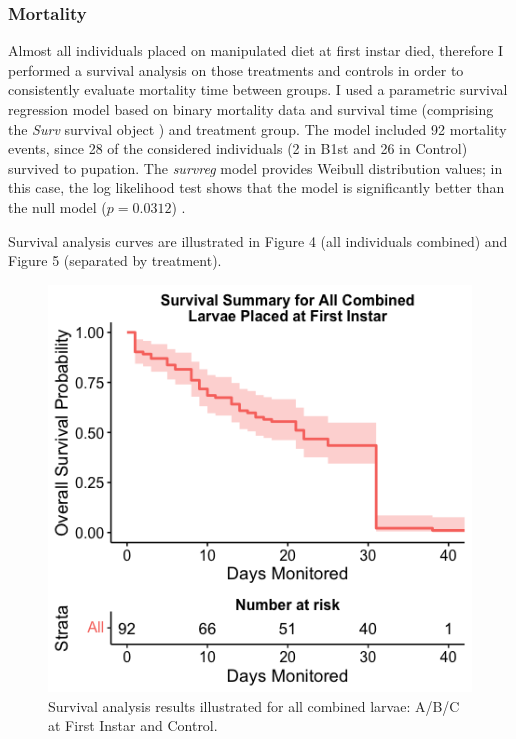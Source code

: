 \documentclass[12pt,]{article}
\begin{document}
\hypertarget{mortality-1}{%
\subsubsection{Mortality}\label{mortality-1}}

Almost all individuals placed on manipulated diet at first instar died,
therefore I performed a survival analysis on those treatments and
controls in order to consistently evaluate mortality time between
groups. I used a parametric survival regression model based on binary
mortality data and survival time (comprising the \emph{Surv} survival
object \autocite{therneau_package_2023}) and treatment group. The model
included 92 mortality events, since 28 of the considered individuals (2
in B1st and 26 in Control) survived to pupation. The \emph{survreg}
model provides Weibull distribution values; in this case, the log
likelihood test shows that the model is significantly better than the
null model (\(p = 0.0312\)) \autocite{zhang_parametric_2016}.

Survival analysis curves are illustrated in Figure 4 (all individuals
combined) and Figure 5 (separated by treatment).

\begin{figure}

{\centering \includegraphics[width=0.5\linewidth]{../Figures/Figure_4} 

}

\caption{Survival analysis results illustrated for all combined larvae: A/B/C at First Instar and Control.}\label{fig:Figure4}
\end{figure}
\end{document}
